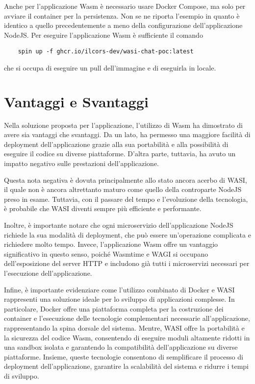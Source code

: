 Anche per l'applicazione Wasm è necessario usare Docker Compose, ma solo per avviare il container per la persistenza.
Non se ne riporta l'esempio in quanto è identico a quello precedentemente a meno della configurazione dell'applicazione
NodeJS. Per eseguire l'applicazione Wasm è sufficiente il comando
\begin{verbatim}
    spin up -f ghcr.io/ilcors-dev/wasi-chat-poc:latest
\end{verbatim}

che si occupa di eseguire un pull dell'immagine e di eseguirla in locale.

\section{Vantaggi e Svantaggi}
Nella soluzione proposta per l'applicazione, l'utilizzo di Wasm ha dimostrato di avere sia vantaggi che svantaggi. Da un
lato, ha permesso una maggiore facilità di deployment dell'applicazione grazie alla sua portabilità e alla possibilità
di eseguire il codice su diverse piattaforme. D'altra parte, tuttavia, ha avuto un impatto negativo sulle prestazioni
dell'applicazione.

Questa nota negativa è dovuta principalmente allo stato ancora acerbo di WASI, il quale non è ancora altrettanto maturo
come quello della controparte NodeJS preso in esame. Tuttavia, con il passare del tempo e l'evoluzione della tecnologia,
è probabile che WASI diventi sempre più efficiente e performante.

Inoltre, è importante notare che ogni microservizio dell'applicazione NodeJS richiede la sua modalità di deployment, che
può essere un'operazione complicata e richiedere molto tempo. Invece, l'applicazione Wasm offre un vantaggio
significativo in questo senso, poiché Wasmtime e WAGI si occupano dell'esposizione del server HTTP e includono già tutti
i microservizi necessari per l'esecuzione dell'applicazione.

Infine, è importante evidenziare come l'utilizzo combinato di Docker e WASI rappresenti una soluzione ideale per lo
sviluppo di applicazioni complesse. In particolare, Docker offre una piattaforma completa per la costruzione dei
container e l'esecuzione delle tecnologie complementari necessarie all'applicazione, rappresentando la spina dorsale del
sistema. Mentre, WASI offre la portabilità e la sicurezza del codice Wasm, consentendo di eseguire moduli altamente
ridotti in una sandbox isolata e garantendo la compatibilità dell'applicazione su diverse piattaforme. Insieme, queste
tecnologie consentono di semplificare il processo di deployment dell'applicazione, garantire la scalabilità del sistema
e ridurre i tempi di sviluppo.